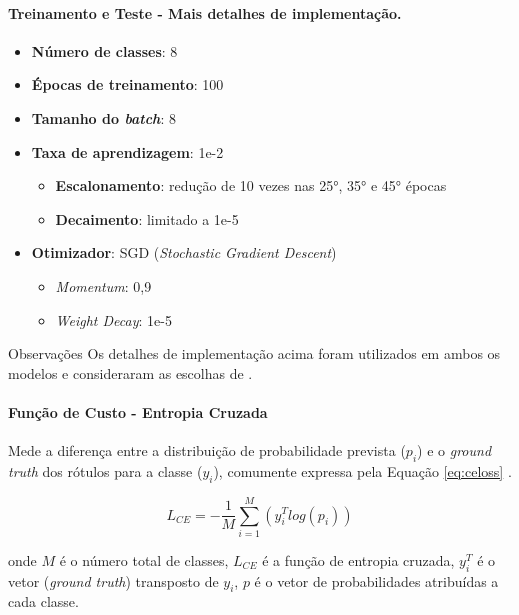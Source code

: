 \documentclass[%
  10pt,%
  aspectratio = 169,%
  compress,%
  t,%
  english,%
  brazilian,%
  tikz,
]{beamer}
\begin{document}
\begin{frame}
\framesubtitle{Treinamento e Teste - Mais detalhes de implementação.}

\begin{itemize}
    \item \textbf{Número de classes}: 8
    \item \textbf{Épocas de treinamento}: 100
    \item \textbf{Tamanho do \textit{batch}}: 8
    \item \textbf{Taxa de aprendizagem}: 1e-2
    \begin{itemize}
        \item \textbf{Escalonamento}: redução de 10 vezes nas 25°, 35° e 45° épocas
        \item \textbf{Decaimento}: limitado a 1e-5
    \end{itemize}
    \item \textbf{Otimizador}: SGD (\textit{Stochastic Gradient Descent})
    \begin{itemize}
        \item \textit{Momentum}: 0,9
        \item \textit{Weight Decay}: 1e-5
    \end{itemize}
\end{itemize}

\begin{block}{Observações}
    Os detalhes de implementação acima foram utilizados em ambos os modelos e consideraram as escolhas de \textcite{Andre2021}.
\end{block}
       
\end{frame}

\begin{frame}
\framesubtitle{Função de Custo - Entropia Cruzada}

Mede a diferença entre a distribuição de probabilidade prevista (\(p_i\)) e o \textit{ground truth} dos rótulos para a classe (\(y_i\)), comumente expressa pela Equação \ref{eq:celoss} \cite{Celoss2019}.


\begin{equation}\label{eq:celoss}
L_{CE} = -\frac{1}{M}\sum_{i=1}^{M}\left ( y_i^{T} log\left ( p_i \right ) \right )
\end{equation}

\noindent
onde \(M\) é o número total de classes, \(L_{CE}\) é a função de entropia cruzada, \(y_i^{T}\) é o vetor (\textit{ground truth}) transposto de \(y_i\), \(p\) é o vetor de probabilidades atribuídas a cada classe.

\end{frame}
\end{document}
